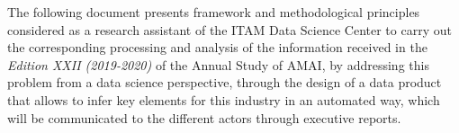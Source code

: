 \documentclass[11pt, oneside]{book}
\begin{document}
The following document presents framework and methodological principles considered as a research assistant of the ITAM Data Science Center to carry out the corresponding processing and analysis of the information received in the \emph{Edition XXII (2019-2020)} of the Annual Study of AMAI, by addressing this problem from a data science perspective, through the design of a data product that allows to infer key elements for this industry in an automated way, which will be communicated to the different actors through executive reports.
\pagestyle{plain}

\noindent 


\tableofcontents


\listoftables

\listoffigures


\mainmatter %

\pagestyle{plain}
















\begin{appendix}



\end{appendix}
\end{document}
